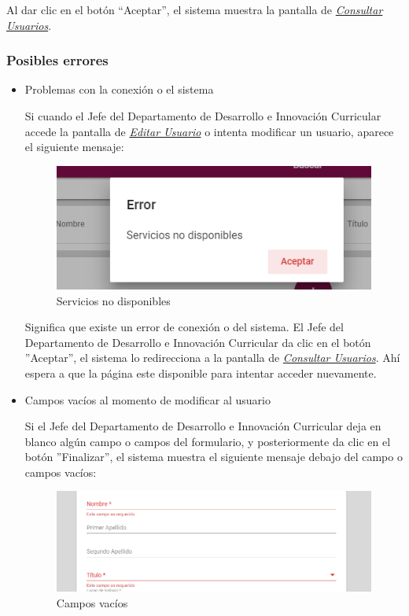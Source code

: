 Al dar clic en el botón “Aceptar”, el sistema muestra la pantalla de \hyperlink{consultarUs-JDDIC}{\textit{Consultar Usuarios}}.

\subsubsection{Posibles errores}
\begin{itemize}
	\item Problemas con la conexión o el sistema
	
	Si cuando el Jefe del Departamento de Desarrollo e Innovación Curricular accede la pantalla de \hyperlink{editarUs-JDDIC}{\textit{Editar Usuario}} o intenta modificar un usuario, aparece el siguiente mensaje:
	\clearpage
	\begin{figure}[H]
		\centering
		\includegraphics[width=0.4\linewidth]{images/SP5/MSGSN}
		\caption{Servicios no disponibles}
		
	\end{figure}
	
	
	Significa que existe un error de conexión o del sistema. El Jefe del Departamento de Desarrollo e Innovación Curricular da clic en el botón ''Aceptar'', el sistema lo redirecciona  a la pantalla de \hyperlink{consultarUs-JDDIC}{\textit{Consultar Usuarios}}. Ahí  espera a que la página este disponible para intentar acceder nuevamente.
	
	\item Campos vacíos al momento de modificar al usuario
	
	Si el Jefe del Departamento de Desarrollo e Innovación Curricular deja en blanco algún campo o campos del formulario, y posteriormente da clic en el botón ''Finalizar'', el sistema muestra el siguiente mensaje debajo del campo o campos vacíos:
	
	\begin{figure}[H]
		\centering
		\includegraphics[width=0.4\linewidth]{images/SP5/MSG44}
		\caption{Campos vacíos}
		\label{mensaje44-JDDIC}
		

\end{figure}
\end{itemize}
